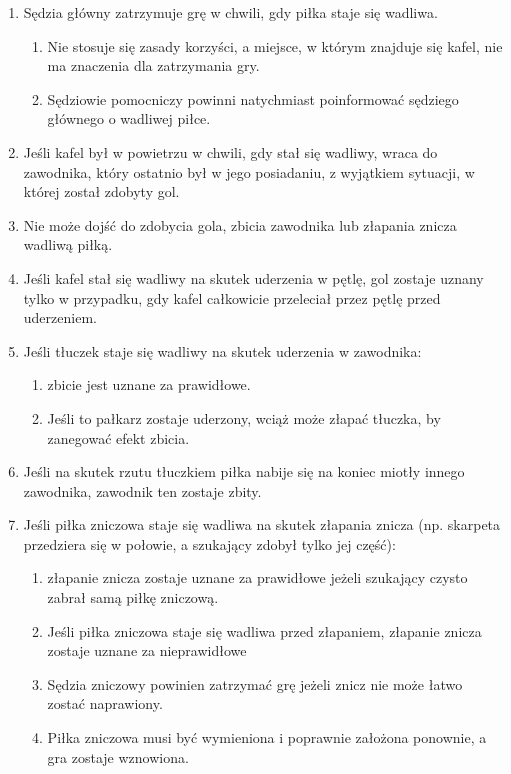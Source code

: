 \documentclass[12pt]{article}
\begin{document}
\begin{enumerate}
\item Sędzia główny zatrzymuje grę w chwili, gdy piłka staje się wadliwa.

\begin{enumerate}
\item Nie stosuje się zasady korzyści, a miejsce, w którym znajduje się
kafel, nie ma znaczenia dla zatrzymania gry.

\item Sędziowie pomocniczy powinni natychmiast poinformować sędziego
głównego o wadliwej piłce.
\end{enumerate}

\item Jeśli kafel był w powietrzu w chwili, gdy stał się wadliwy, wraca do
zawodnika, który ostatnio był w jego posiadaniu, z wyjątkiem sytuacji, w
której został zdobyty gol.

\item Nie może dojść do zdobycia gola, zbicia zawodnika lub złapania znicza
wadliwą piłką.

\item Jeśli kafel stał się wadliwy na skutek uderzenia w pętlę, gol zostaje
uznany tylko w przypadku, gdy kafel całkowicie przeleciał przez pętlę
przed uderzeniem.

\item Jeśli tłuczek staje się wadliwy na skutek uderzenia w zawodnika:
\begin{enumerate}
\item zbicie jest uznane za prawidłowe.

\item Jeśli to pałkarz zostaje uderzony, wciąż może złapać tłuczka, by
zanegować efekt zbicia.
\end{enumerate}

\item Jeśli na skutek rzutu tłuczkiem piłka nabije się na koniec miotły
innego zawodnika, zawodnik ten zostaje zbity.

\item Jeśli piłka zniczowa staje się wadliwa na skutek złapania znicza (np.
skarpeta przedziera się w połowie, a szukający zdobył tylko jej część):
\begin{enumerate}
\item złapanie znicza zostaje uznane za prawidłowe jeżeli szukający czysto
zabrał samą piłkę zniczową.

\item Jeśli piłka zniczowa staje się wadliwa przed złapaniem, złapanie
znicza zostaje uznane za nieprawidłowe

\item Sędzia zniczowy powinien zatrzymać grę jeżeli znicz nie może łatwo
zostać naprawiony.

\item Piłka zniczowa musi być wymieniona i poprawnie założona ponownie, a
gra zostaje wznowiona.
\end{enumerate}
\end{enumerate}
\end{document}
